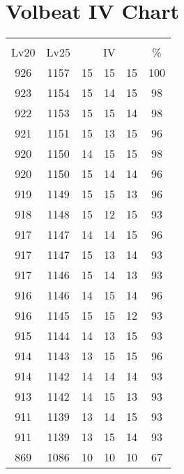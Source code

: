\documentclass{article}%
\begin{document}
%
\normalsize%
\section{Volbeat IV Chart}%
\label{sec:Volbeat IV Chart}%
\renewcommand{\arraystretch}{1.5}%
\begin{tabular}{|c|c|c|c|c|c|}%
\hline%
\multicolumn{6}{|c|}{\textcolor{white}{ 
\linebreak{Volbeat}
}%
\cellcolor{black}}\\%
\multicolumn{1}{|c}{Lv20}&\multicolumn{1}{c|}{Lv25}&\multicolumn{3}{c|}{IV}&\multicolumn{1}{|c|}{\%}\\%
\hline%
\rowcolor{color100}%
926&1157&15&15&15&100\\%
\hline%
\rowcolor{color98}%
923&1154&15&14&15&98\\%
\hline%
\rowcolor{color98}%
922&1153&15&15&14&98\\%
\hline%
\rowcolor{color96}%
921&1151&15&13&15&96\\%
\hline%
\rowcolor{color98}%
920&1150&14&15&15&98\\%
\hline%
\rowcolor{color96}%
920&1150&15&14&14&96\\%
\hline%
\rowcolor{color96}%
919&1149&15&15&13&96\\%
\hline%
\rowcolor{color93}%
918&1148&15&12&15&93\\%
\hline%
\rowcolor{color96}%
917&1147&14&14&15&96\\%
\hline%
\rowcolor{color93}%
917&1147&15&13&14&93\\%
\hline%
\rowcolor{color93}%
917&1146&15&14&13&93\\%
\hline%
\rowcolor{color96}%
916&1146&14&15&14&96\\%
\hline%
\rowcolor{color93}%
916&1145&15&15&12&93\\%
\hline%
\rowcolor{color93}%
915&1144&14&13&15&93\\%
\hline%
\rowcolor{color96}%
914&1143&13&15&15&96\\%
\hline%
\rowcolor{color93}%
914&1142&14&14&14&93\\%
\hline%
\rowcolor{color93}%
913&1142&14&15&13&93\\%
\hline%
\rowcolor{color93}%
911&1139&13&14&15&93\\%
\hline%
\rowcolor{color93}%
911&1139&13&15&14&93\\%
\hline%
\rowcolor{color91}%
869&1086&10&10&10&67\\%
\end{tabular}

%
\end{document}
